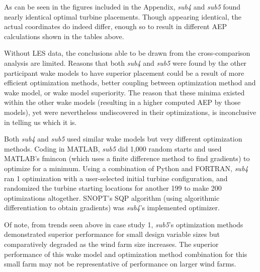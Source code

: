 	As can be seen in the figures included in the Appendix, \textit{sub4} and \textit{sub5} found nearly identical optimal turbine placements.
	Though appearing identical, the actual coordinates do indeed differ, enough so to result in different AEP calculations shown in the tables above.

	Without LES data, the conclusions able to be drawn from the cross-comparison analysis are limited.
	Reasons that both \textit{sub4} and \textit{sub5} were found by the other participant wake models to have superior placement could be a result of more efficient optimization methods, better coupling between optimization method and wake model, or wake model superiority.
	The reason that these minima existed within the other wake models (resulting in a higher computed AEP by those models), yet were nevertheless undiscovered in their optimizations, is inconclusive in telling us which it is.

	Both \textit{sub4} and \textit{sub5} used similar wake models but very different optimization methods.
	Coding in MATLAB, \textit{sub5} did 1,000 random starts and used MATLAB's fmincon (which uses a finite difference method to find gradients) to optimize for a minimum.
	Using a combination of Python and FORTRAN, \textit{sub4} ran 1 optimization with a user-selected initial turbine configuration, and randomized the turbine starting locations for another 199 to make 200 optimizations altogether.
	SNOPT's SQP algorithm (using algorithmic differentiation to obtain gradients) was \textit{sub4}'s implemented optimizer.

	Of note, from trends seen above in case study 1, \textit{sub5}'s optimization methods demonstrated superior performance for small design variable sizes but comparatively degraded as the wind farm size increases.
	The superior performance of this wake model and optimization method combination for this small farm may not be representative of performance on larger wind farms.



